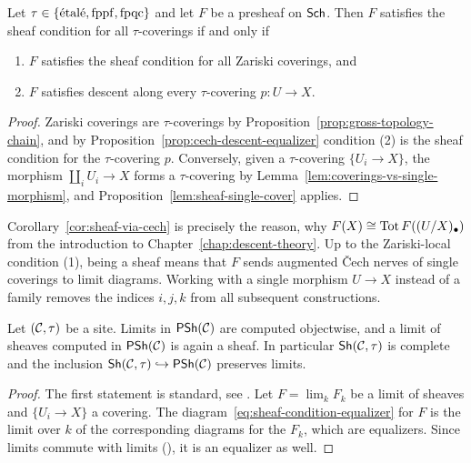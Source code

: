 \begin{corollary}\label{cor:sheaf-via-cech}
	Let $\tau\in\{\text{\'etal\'e}, \mathrm{fppf}, \mathrm{fpqc}\}$ and let $F$ be a presheaf on $\mathsf{Sch}$. Then $F$ satisfies the sheaf condition for all $\tau$-coverings if and only if
	\begin{enumerate}
		\item $F$ satisfies the sheaf condition for all Zariski coverings, and
		\item $F$ satisfies descent along every $\tau$-covering $p:U\to X$.
	\end{enumerate}
\end{corollary}

\begin{proof}
	Zariski coverings are $\tau$-coverings by Proposition~\ref{prop:gross-topology-chain}, and by Proposition~\ref{prop:cech-descent-equalizer} condition (2) is the sheaf condition for the $\tau$-covering $p$. Conversely, given a $\tau$-covering $\{U_i\to X\}$, the morphism $\coprod_iU_i\to X$ forms a $\tau$-covering by Lemma~\ref{lem:coverings-vs-single-morphism}, and Proposition~\ref{lem:sheaf-single-cover} applies.
\end{proof}

\begin{remark}
	Corollary~\ref{cor:sheaf-via-cech} is precisely the reason, why $F(X)\cong\operatorname{Tot} F((U/X)_\bullet)$ from the introduction to Chapter~\ref{chap:descent-theory}. Up to the Zariski-local condition (1), being a sheaf means that $F$ sends augmented \v{C}ech nerves of single coverings to limit diagrams. Working with a single morphism $U\to X$ instead of a family removes the indices $i,j,k$ from all subsequent constructions.
\end{remark}

\begin{lemma}\label{cor:limit-sheaf}
	Let $(\mathcal{C},\tau)$ be a site. Limits in $\mathsf{PSh}\!\left(\mathcal{C}\right)$ are computed objectwise, and a limit of sheaves computed in $\mathsf{PSh}\!\left(\mathcal{C}\right)$ is again a sheaf. In particular $\mathsf{Sh}\!\left(\mathcal{C},\tau\right)$ is complete and the inclusion $\mathsf{Sh}\!\left(\mathcal{C},\tau\right)\hookrightarrow\mathsf{PSh}\!\left(\mathcal{C}\right)$ preserves limits.
\end{lemma}

\begin{proof}
	The first statement is standard, see \cite[][Sec.~V.3]{MacLaneCFWM}. Let $F=\lim_kF_k$ be a limit of sheaves and $\{U_i\to X\}$ a covering. The diagram~\eqref{eq:sheaf-condition-equalizer} for $F$ is the limit over $k$ of the corresponding diagrams for the $F_k$, which are equalizers. Since limits commute with limits (\cite[][Sec.~IX.2]{MacLaneCFWM}), it is an equalizer as well.
\end{proof}


